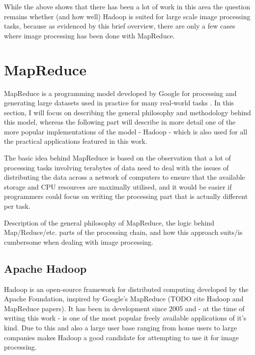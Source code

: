 \documentclass [12pt,a4paper]{report}
\begin{document}
While the above shows that there has been a lot of work in this area the question remains whether (and how well) Hadoop is suited for large scale image processing tasks, because as evidenced by this brief overview, there are only a few cases where image processing has been done with MapReduce. 


\section{MapReduce}

MapReduce is a programming model developed by Google for processing and generating large datasets used in practice for many real-world tasks \cite{Dean:2008:MSD:1327452.1327492}. In this section, I will focus on describing the general philosophy and methodology behind this model, whereas the following part will describe in more detail one of the more popular implementations of the model - Hadoop - which is also used for all the practical applications featured in this work.

The basic idea behind MapReduce is based on the observation that a lot of processing tasks involving terabytes of data need to deal with the issues of distributing the data across a network of computers to ensure that the available storage and CPU resources are maximally utilised, and it would be easier if programmers could focus on writing the processing part that is actually different per task.
 
Description of the general philosophy of MapReduce, the logic behind Map/Reduce/etc. parts of the processing chain, and how this approach suits/is cumbersome when dealing with image processing.

\subsection{Apache Hadoop}
Hadoop is an open-source framework for distributed computing developed by the Apache Foundation, inspired by Google's MapReduce (TODO cite Hadoop and MapReduce papers). It has been in development since 2005 and - at the time of writing this work - is one of the most popular freely available applications of it's kind. Due to this and also a large user base ranging from home users to large companies makes Hadoop a good candidate for attempting to use it for image processing.
\end{document}
